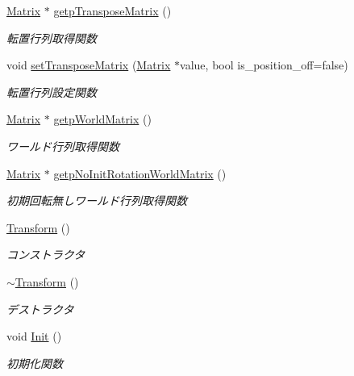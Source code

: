 \begin{DoxyCompactItemize}
\mbox{\hyperlink{class_matrix}{Matrix}} $\ast$ \mbox{\hyperlink{class_transform_aee502a42628072064f2b3d2060f2d53f}{getp\+Transpose\+Matrix}} ()
\begin{DoxyCompactList}\small\item\em 転置行列取得関数 \end{DoxyCompactList}\item 
void \mbox{\hyperlink{class_transform_a710f94248ae113eb6b28849a01f3fedc}{set\+Transpose\+Matrix}} (\mbox{\hyperlink{class_matrix}{Matrix}} $\ast$value, bool is\+\_\+position\+\_\+off=false)
\begin{DoxyCompactList}\small\item\em 転置行列設定関数 \end{DoxyCompactList}\item 
\mbox{\hyperlink{class_matrix}{Matrix}} $\ast$ \mbox{\hyperlink{class_transform_a58114e02f195f91f9bb807d49c34fe32}{getp\+World\+Matrix}} ()
\begin{DoxyCompactList}\small\item\em ワールド行列取得関数 \end{DoxyCompactList}\item 
\mbox{\hyperlink{class_matrix}{Matrix}} $\ast$ \mbox{\hyperlink{class_transform_a17fb2c084b43710345a261438ae67b7c}{getp\+No\+Init\+Rotation\+World\+Matrix}} ()
\begin{DoxyCompactList}\small\item\em 初期回転無しワールド行列取得関数 \end{DoxyCompactList}\item 
\mbox{\hyperlink{class_transform_aa08ca4266efabc768973cdeea51945ab}{Transform}} ()
\begin{DoxyCompactList}\small\item\em コンストラクタ \end{DoxyCompactList}\item 
\mbox{\hyperlink{class_transform_aa72e286c069850db80927b0e6554cd3e}{$\sim$\+Transform}} ()
\begin{DoxyCompactList}\small\item\em デストラクタ \end{DoxyCompactList}\item 
void \mbox{\hyperlink{class_transform_a4b911801aa231c13922c0e11032b8d5a}{Init}} ()
\begin{DoxyCompactList}\small\item\em 初期化関数 \end{DoxyCompactList}\item 

\end{DoxyCompactItemize}

